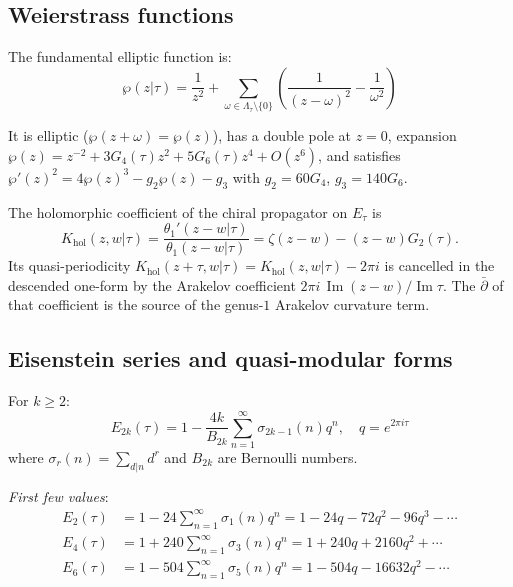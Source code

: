 \subsection{Weierstrass functions}

\begin{definition}
\label{def:weierstrass-p}
The fundamental elliptic function is:
\begin{equation}
\wp(z|\tau) = \frac{1}{z^2} + \sum_{\omega \in \Lambda_\tau \setminus \{0\}}
\left(\frac{1}{(z-\omega)^2} - \frac{1}{\omega^2}\right)
\end{equation}

It is elliptic ($\wp(z + \omega) = \wp(z)$), has a double pole at $z = 0$, expansion $\wp(z) = z^{-2} + 3G_4(\tau) z^2 + 5G_6(\tau) z^4 + O(z^6)$, and satisfies $\wp'(z)^2 = 4\wp(z)^3 - g_2\wp(z) - g_3$ with $g_2 = 60G_4$, $g_3 = 140G_6$.
\end{definition}

\begin{remark}
\label{rem:wp-config-space}
The holomorphic coefficient of the chiral propagator on $E_\tau$ is
\[
K_{\mathrm{hol}}(z,w|\tau)
=
\frac{\theta_1'(z-w|\tau)}{\theta_1(z-w|\tau)}
=
\zeta(z-w)-(z-w)G_2(\tau).
\]
Its quasi-periodicity
$K_{\mathrm{hol}}(z+\tau,w|\tau)=K_{\mathrm{hol}}(z,w|\tau)-2\pi i$
is cancelled in the descended one-form by the Arakelov coefficient
$2\pi i\,\operatorname{Im}(z-w)/\operatorname{Im}\tau$. The
$\bar\partial$ of that coefficient is the source of the genus-$1$
Arakelov curvature term.
\end{remark}

\subsection{Eisenstein series and quasi-modular forms}

\begin{definition}
\label{def:eisenstein}
For $k \geq 2$:
\begin{equation}
E_{2k}(\tau) = 1 - \frac{4k}{B_{2k}} \sum_{n=1}^{\infty} \sigma_{2k-1}(n) q^n, \quad q = e^{2\pi i \tau}
\end{equation}
where $\sigma_r(n) = \sum_{d|n} d^r$ and $B_{2k}$ are Bernoulli numbers.

\emph{First few values}:
\begin{align}
E_2(\tau) &= 1 - 24\sum_{n=1}^{\infty} \sigma_1(n) q^n = 1 - 24q - 72q^2 - 96q^3 - \cdots \\
E_4(\tau) &= 1 + 240\sum_{n=1}^{\infty} \sigma_3(n) q^n = 1 + 240q + 2160q^2 + \cdots \\
E_6(\tau) &= 1 - 504\sum_{n=1}^{\infty} \sigma_5(n) q^n = 1 - 504q - 16632q^2 - \cdots
\end{align}
\end{definition}

